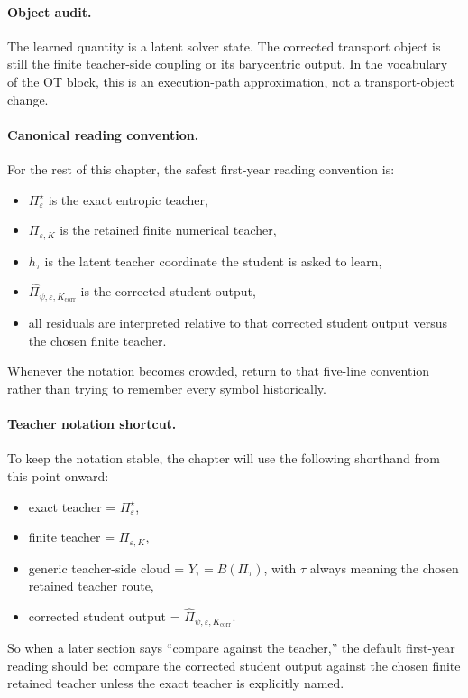 \paragraph{Object audit.}
The learned quantity is a latent solver state.  The corrected transport object is
still the finite teacher-side coupling or its barycentric output.  In the
vocabulary of the OT block, this is an execution-path approximation, not a
transport-object change.

\paragraph{Canonical reading convention.}
For the rest of this chapter, the safest first-year reading convention is:
\begin{itemize}
  \item \(\Pi_\varepsilon^\star\) is the exact entropic teacher,
  \item \(\Pi_{\varepsilon,K}\) is the retained finite numerical teacher,
  \item \(h_\tau\) is the latent teacher coordinate the student is asked to learn,
  \item \(\widehat\Pi_{\psi,\varepsilon,K_{\mathrm{corr}}}\) is the corrected student
  output,
  \item all residuals are interpreted relative to that corrected student output
  versus the chosen finite teacher.
\end{itemize}
Whenever the notation becomes crowded, return to that five-line convention rather
than trying to remember every symbol historically.

\paragraph{Teacher notation shortcut.}
To keep the notation stable, the chapter will use the following shorthand from this
point onward:
\begin{itemize}
  \item exact teacher = \(\Pi_\varepsilon^\star\),
  \item finite teacher = \(\Pi_{\varepsilon,K}\),
  \item generic teacher-side cloud = \(Y_\tau=B(\Pi_\tau)\), with \(\tau\) always
  meaning the chosen retained teacher route,
  \item corrected student output = \(\widehat\Pi_{\psi,\varepsilon,K_{\mathrm{corr}}}\).
\end{itemize}
So when a later section says ``compare against the teacher,'' the default first-year
reading should be: compare the corrected student output against the chosen finite
retained teacher unless the exact teacher is explicitly named.

